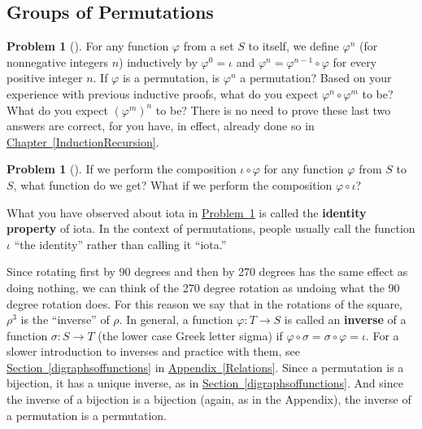\documentclass[10pt,]{book}
\newcommand{\terminology}[1]{\textbf{#1}}
\theoremstyle{plain}
\theoremstyle{definition}
\newtheorem{activity}[project]{Problem}
\theoremstyle{definition}
\numberwithin{equation}{chapter}
\begin{document}
\subsection[{Groups of Permutations}]{Groups of Permutations}\label{subsection-59}
\begin{activity}[] \label{activity-250}
\hypertarget{p-1456}{}%
For any function \(\varphi\) from a set \(S\) to itself, we define \(\varphi^n\) (for nonnegative integers \(n\)) inductively by \(\varphi^0 =
\iota\) and \(\varphi^n = \varphi^{n-1}\circ\varphi\) for every positive integer \(n\). If \(\varphi\) is a permutation, is \(\varphi^n\) a permutation? Based on your experience with previous inductive proofs, what do you expect \(\varphi^n\circ \varphi^m\) to be? What do you expect \((\varphi^m)^n\) to be? There is no need to prove these last two answers are correct, for you have, in effect, already done so in \hyperref[InductionRecursion]{Chapter~\ref{InductionRecursion}}.%
\end{activity}
\begin{activity}[] \label{identityproperty}
\hypertarget{p-1458}{}%
If we perform the composition \(\iota\circ \varphi\) for any function \(\varphi\) from \(S\) to \(S\), what function do we get? What if we perform the composition \(\varphi\circ\iota\)?%
\end{activity}
\hypertarget{p-1460}{}%
What you have observed about iota in \hyperref[identityproperty]{Problem~\ref{identityproperty}} is called the \terminology{identity property} of iota. In the context of permutations, people usually call the function \(\iota\) ``the identity'' rather than calling it ``iota.''%
\par
\hypertarget{p-1461}{}%
Since rotating first by 90 degrees and then by 270 degrees has the same effect as doing nothing, we can think of the 270 degree rotation as undoing what the 90 degree rotation does. For this reason we say that in the rotations of the square, \(\rho^3\) is the ``inverse'' of \(\rho\). In general, a function \(\varphi:T\rightarrow S\) is called an \terminology{inverse} of a function \(\sigma:S
\rightarrow T\) (the lower case Greek letter sigma) if \(\varphi\circ \sigma= \sigma
\circ\varphi =
\iota\). For a slower introduction to inverses and practice with them, see \hyperref[digraphsoffunctions]{Section~\ref{digraphsoffunctions}} in \hyperref[Relations]{Appendix~\ref{Relations}}.  Since a permutation is a bijection, it has a unique inverse, as in \hyperref[digraphsoffunctions]{Section~\ref{digraphsoffunctions}}.  And since the inverse of a bijection is a bijection (again, as in the Appendix), the inverse of a permutation is a permutation.%
\end{document}
